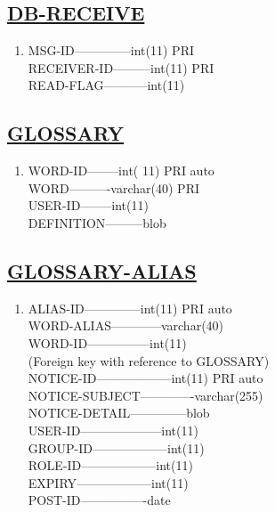 \documentclass{article}
\begin{document}
\subsection*{\underline{DB-RECEIVE}}
\begin{enumerate}
\item[{}{}]

MSG-ID--------------int(11)     PRI \\
RECEIVER-ID---------int(11)     PRI\\ 
READ-FLAG-----------int(11)\\
\end{enumerate}
\subsection*{\underline{GLOSSARY}}
\begin{enumerate}
\item[{}{}]

WORD-ID--------int( 11)              PRI           auto \\
WORD----------varchar(40)       PRI \\
USER-ID--------int(11)\\ 
DEFINITION---------blob\\
\end{enumerate} 
\subsection*{\underline{GLOSSARY-ALIAS}} 
\begin{enumerate}
\item[{}{}]

ALIAS-ID--------------int(11)              PRI               auto \\
WORD-ALIAS------------varchar(40)\\ 
WORD-ID---------------int(11)\\          
(Foreign key with reference to GLOSSARY) \\
NOTICE-ID------------------int(11)              PRI        auto \\
NOTICE-SUBJECT-------------varchar(255)\\ 
NOTICE-DETAIL--------------blob \\
USER-ID--------------------int(11) \\
GROUP-ID------------------int(11) \\
ROLE-ID------------------int(11) \\
EXPIRY------------------int(11)\\ 
POST-ID----------------date\\
\end{enumerate}
\end{document}
